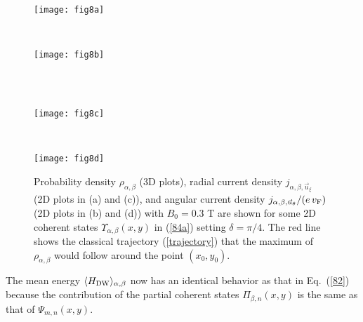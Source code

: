 \documentclass[aps,showpacs,showkeys]{revtex4}
\begin{document}
\begin{figure}[htb]
	\centering
	\begin{minipage}[b]{0.33\textwidth}
		\texttt{[image: fig8a]}\\
		\label{fig:rho_alphabeta1_a}
	\end{minipage}
\hspace{3cm}
	~ %
	\begin{minipage}[b]{0.33\textwidth}
		\texttt{[image: fig8b]}\\
		\label{fig:rho_alphabeta1_b}
	\end{minipage}
	\\ [2ex]
	~ %
	\begin{minipage}[b]{0.33\textwidth}
		\texttt{[image: fig8c]}\\
		\label{fig:jtheta_alphabeta1_e}
	\end{minipage}
\hspace{3cm}
	~ %
	\begin{minipage}[b]{0.33\textwidth}
		\texttt{[image: fig8d]}\\
		\label{fig:jtheta_alphabeta1_f}
	\end{minipage}
	\caption{\label{fig:rho_alphabeta1}Probability density $\rho_{\alpha,\beta}$ (3D plots), radial current density $j_{\alpha,\beta,\vec{u}_{\xi}}$ (2D plots in (a) and (c)), and angular current density $j_{\alpha,\beta,\vec{u}_{\theta}}/(e\,v_{\rm F})$ (2D plots in (b) and (d)) with $B_{0}=0.3$ T are shown for some 2D coherent states $\Upsilon_{\alpha,\beta}(x,y)$ in (\ref{84a}) setting $\delta=\pi/4$. The red line shows the classical trajectory (\ref{trajectory}) that the maximum of $\rho_{\alpha,\beta}$ would follow around the point $(x_{0},y_{0})$.}
\end{figure}



The mean energy $\langle H_{\rm DW}\rangle_{\alpha,\beta}$ now has an identical behavior as that in Eq.~(\ref{82}) because the contribution of the partial coherent states $\Pi_{\beta,n}(x,y)$ is the same as that of $\Psi_{m,n}(x,y)$.
\end{document}
